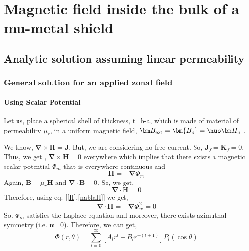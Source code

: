 
\chapter{Magnetic field inside the bulk of a mu-metal shield}
\section{Analytic solution assuming linear permeability}
\subsection{General solution for an applied zonal field}
\subsubsection{Using Scalar Potential}

Let us, place a spherical shell of thickness, t=b-a, which is made of material of permeability $\mu_r$, in a uniform magnetic field, \(\bm B_{\rm ext}=\bm{B_o}= \muo \bm H_o\) \cite{jackson}.

We know, \(\bm{\nabla}\times\bm{H}=\bm{J}\). But, we are considering no free current. So, \(\bm{J}_f=\bm{K}_f=0\). Thus, we get , \(\bm{\nabla}\times\bm{H}=0\) everywhere which implies that there exists a magnetic scalar potential \(\Phi_m\) that is everywhere continuous and
\begin{equation}\label{H}
\bm{H}=-\bm{\nabla}\Phi_m
\end{equation} 
Again, \(\bm{B}=\mu_r\bm{H}\) and \(\bm{\nabla}\cdot\bm{B}=0\). So, we get,
\begin{equation}\label{nablaH}
\bm{\nabla}\cdot\bm{H}=0
\end{equation}
Therefore, using eq. [\ref{H},\ref{nablaH}] we get,
\begin{equation}
\bm{\nabla}\cdot\bm{H}=-\bm{\nabla}\Phi_m^2=0
\end{equation}
So, $\Phi_m$ satisfies the Laplace equation and moreover, there exists azimuthal symmetry (i.e. m=0). Therefore, we can get,
\begin{equation}
\Phi(r,\theta)=\sum_{l=0}^{\infty} [A_lr^l+B_lr^{-(l+1)}]P_l(\cos\theta)
\end{equation}

